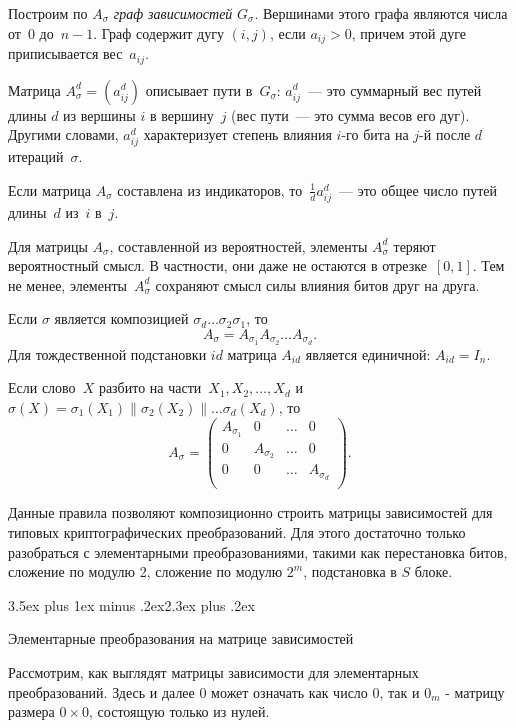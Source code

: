 \documentclass[a4paper,12pt]{report}
\makeatletter
\theoremstyle{plain} %
\theoremstyle{definition}
\theoremstyle{remark}
\renewcommand{\section}{\@startsection{section}{1}{18pt}%
{3.5ex plus 1ex minus .2ex}{2.3ex plus .2ex}%
{\normalfont\Large\bfseries\raggedright}}%
\makeatother
\begin{document}
\begin{large}
Построим по $A_\sigma$ {\it граф зависимостей} $G_\sigma$.
Вершинами этого графа являются числа от~$0$ до~$n-1$.
Граф содержит дугу $(i,j)$, если $a_{ij}>0$,
причем этой дуге приписывается вес~$a_{ij}$.

Матрица $A_\sigma^d=(a_{ij}^d)$ описывает пути в~$G_\sigma$:
$a_{ij}^d$~--- это суммарный вес путей длины $d$ из вершины $i$
в вершину~$j$ (вес пути~--- это сумма весов его дуг).
Другими словами, $a_{ij}^d$ характеризует степень влияния 
$i$-го бита на $j$-й после $d$ итераций~$\sigma$.

Если матрица $A_\sigma$ составлена из индикаторов,
то~$\frac{1}{d}a_{ij}^d$~--- это общее число путей длины~$d$
из~$i$ в~$j$.

Для матрицы $A_\sigma$, составленной из вероятностей,
элементы $A_\sigma^d$ теряют вероятностный смысл.
В частности, они даже не остаются в отрезке~$[0,1]$.
%
Тем не менее, элементы~$A_\sigma^d$ сохраняют смысл силы 
влияния битов друг на друга.

Если $\sigma$ является композицией $\sigma_d\ldots\sigma_2\sigma_1$,
то
$$
A_\sigma=A_{\sigma_1}A_{\sigma_2}\ldots A_{\sigma_d}.
$$
Для тождественной подстановки $id$ матрица $A_{id}$
является единичной: $A_{id}=I_n$.

Если слово~$X$ разбито на части~$X_1,X_2,\ldots,X_d$ 
и~$\sigma(X)=\sigma_1(X_1)\parallel\sigma_2(X_2)\parallel\ldots\sigma_d(X_d)$,
то
$$
A_\sigma=
\begin{pmatrix}
A_{\sigma_1} & 0 & \ldots & 0\\
0 & A_{\sigma_2} & \ldots & 0\\
0 &   0          & \ldots & A_{\sigma_d}\\
\end{pmatrix}.
$$

Данные правила позволяют композиционно строить матрицы 
зависимостей для типовых криптографических преобразований.
Для этого достаточно только разобраться с элементарными преобразованиями, такими как перестановка битов, сложение по модулю 2, сложение по модулю $2^m$, подстановка в $S$ блоке.

\section{Элементарные преобразования на матрице зависимостей}

Рассмотрим, как выглядят матрицы зависимости для элементарных преобразований. Здесь и далее 0 может означать как число 0, так и $0_m$ - матрицу размера $0 \times 0$, состоящую только из нулей.



\end{large}
\end{document}
